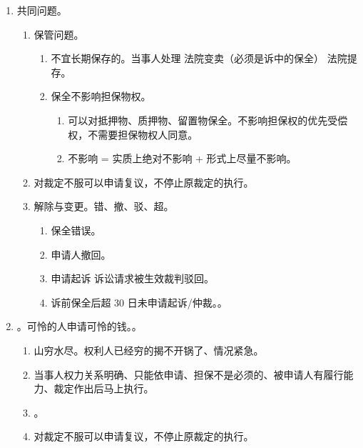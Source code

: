 \begin{enumerate}
\begin{enumerate}
\begin{enumerate}
                \end{enumerate}
        \end{enumerate}
  \item 共同问题。
        \begin{enumerate}
          \item 保管问题。
                \begin{enumerate}
                  \item 不宜长期保存的。当事人处理 \hz 法院变卖（必须是诉中的保全） \yjt 法院提存。
                  \item 保全不影响担保物权。
                        \begin{enumerate}
                          \item 可以对抵押物、质押物、留置物保全。不影响担保权的优先受偿权，不需要担保物权人同意。
                          \item 不影响 = 实质上绝对不影响 + 形式上尽量不影响。
                        \end{enumerate}
                \end{enumerate}
          \item 对裁定不服可以申请复议，不停止原裁定的执行。
          \item 解除与变更。错、撤、驳、超。
                \begin{enumerate}
                  \item 保全错误。
                  \item 申请人撤回。
                  \item 申请起诉 \hz 诉讼请求被生效裁判驳回。
                  \item 诉前保全后超 30 日未申请起诉/仲裁。。
                \end{enumerate}
        \end{enumerate}
  \item {}。可怜的人申请可怜的钱。。
        \begin{enumerate}
          \item 山穷水尽。权利人已经穷的揭不开锅了、情况紧急。
          \item 当事人权力关系明确、只能依申请、担保不是必须的、被申请人有履行能力、裁定作出后马上执行。
          \item {}。
          \item 对裁定不服可以申请复议，不停止原裁定的执行。
        \end{enumerate}

\end{enumerate}

